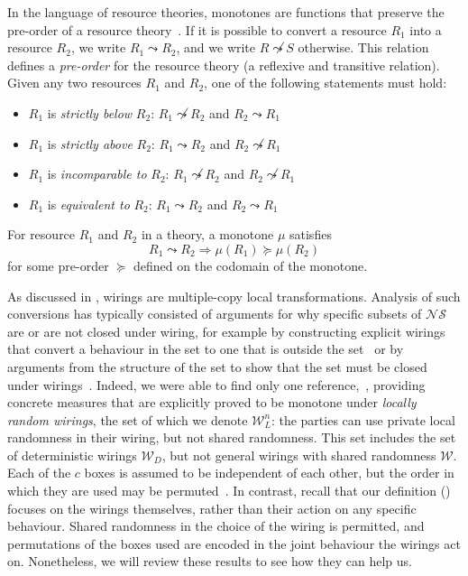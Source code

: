 \documentclass[10pt, a4paper]{article}
\numberwithin{equation}{section} %
\theoremstyle{definition}
\theoremstyle{plain}
\newcommand{\?}{\mathrel{?}} %
\newcommand{\sW}{\mathcal{W}}
\newcommand{\NSs}{\mathcal{NS}}
\begin{document}
                  In the language of resource theories, monotones are functions that preserve the pre-order of a resource theory~\cite{NonclassicalCausation}. If it is possible to convert a resource \(R_1\) into a resource \(R_2\), we write \(R_1 \leadsto R_2\), and we write \(R \not\leadsto S\) otherwise. This relation defines a \emph{pre-order} for the resource theory (a reflexive and transitive relation). Given any two resources \(R_1\) and \(R_2\), one of the following statements must hold:
                  \begin{itemize}
                    \item \(R_1\) is \emph{strictly below} \(R_2\): \(R_1 \not\leadsto R_2\) and \(R_2 \leadsto R_1\)
                    \item \(R_1\) is \emph{strictly above} \(R_2\): \(R_1 \leadsto R_2\) and \(R_2 \not\leadsto R_1\)
                    \item \(R_1\) is \emph{incomparable to} \(R_2\): \(R_1 \not\leadsto R_2\) and \(R_2 \not\leadsto R_1\)
                    \item \(R_1\) is \emph{equivalent to} \(R_2\): \(R_1 \leadsto R_2\) and \(R_2 \leadsto R_1\)
                  \end{itemize}

                  For resource \(R_1\) and \(R_2\) in a theory, a monotone \(\mu\) satisfies
                  \begin{equation}
                    R_1 \leadsto R_2 \Rightarrow \mu(R_1) \succeq \mu(R_2)
                  \end{equation}
                  for some pre-order \(\succeq\) defined on the codomain of the monotone.

                  As discussed in , wirings are multiple-copy local transformations. Analysis of such conversions has typically consisted of arguments for why specific subsets of \(\NSs\) are or are not closed under wiring, for example by constructing explicit wirings that convert a behaviour in the set to one that is outside the set~\cite{ClosedCorrSets} or by arguments from the structure of the set to show that the set must be closed under wirings~\cite{NonlocalZoo}. Indeed, we were able to find only one reference,~\cite{NLMonotones}, providing concrete measures that are explicitly proved to be monotone under \emph{locally random wirings}, the set of which we denote \(\sW_L^n\): the parties can use private local randomness in their wiring, but not shared randomness. This set includes the set of deterministic wirings \(\sW_D\), but not general wirings with shared randomness \(\sW\). Each of the \(c\) boxes is assumed to be independent of each other, but the order in which they are used may be permuted~\cite[Sec. 3]{NLMonotones}. In contrast, recall that our definition () focuses on the wirings themselves, rather than their action on any specific behaviour. Shared randomness in the choice of the wiring is permitted, and permutations of the boxes used are encoded in the joint behaviour the wirings act on. Nonetheless, we will review these results to see how they can help us.
\end{document}
